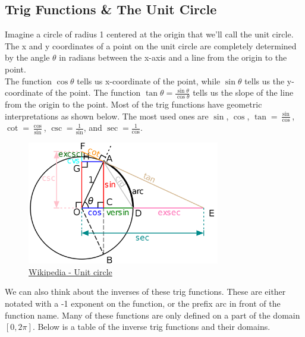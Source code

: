 \subsection{Trig Functions \& The Unit Circle}

Imagine a circle of radius 1 centered at the origin that we'll call the unit circle. The x and y coordinates of a point on the unit circle are completely determined by the angle $\theta$ in radians between the x-axis and a line from the origin to the point.\\


The function $\cos{\theta}$ tells us x-coordinate of the point, while $\sin{\theta}$ tells us the y-coordinate of the point. The function $\tan{\theta} = \frac{\sin{\theta}}{\cos{\theta}}$ tells us the slope of the line from the origin to the point. Most of the trig functions have geometric interpretations as shown below. The most used ones are $\sin$, $\cos$, $\tan=\frac{\sin}{\cos}$, $\cot = \frac{\cos}{\sin}$, $\csc=\frac{1}{\sin}$, and $\sec=\frac{1}{\cos}$.

\begin{figure}[H]
	\label{unitCircle}
	\centering
	\includegraphics[width = 0.75\textwidth]{./backgroundReview/algebraPreCalc/unitCircle2.png}
	\caption{\hyperref{https://en.wikipedia.org/wiki/Unit_circle}{}{}{Wikipedia - Unit circle}}
\end{figure}


We can also think about the inverses of these trig functions. These are either notated with a -1 exponent on the function, or the prefix arc in front of the function name. Many of these functions are only defined on a part of the domain $\left[0, 2\pi\right]$. Below is a table of the inverse trig functions and their domains.

